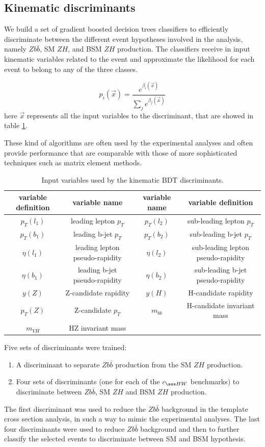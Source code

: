 \subsection{Kinematic discriminants}

We build a set of gradient boosted decision trees classifiers to efficiently discriminate
between the different event hypotheses involved in the analysis, namely $Z b\bar{b}$,
SM $Z H$, and BSM $Z H$ production. 
The classifiers receive in input kinematic variables related to the event and approximate
the likelihood for each event to belong to any of the three classes.

\begin{equation}
p_{i}(\vec x) = \frac{ e^{\beta_{i}(\vec x) } }{ \sum_j e^{\beta_{j}(\vec x) } }
\end{equation}
here $\vec x$ represents all the input variables to the discriminant, that are showed in table
\ref{tab:bdt_features}.

These kind of algorithms are often used by the experimental analyses and often provide
performance that are comparable with those of more sophisticated techniques such as matrix
element methods. 

\begin{table}
\centering
\begin{tabular}{||c|c||c|c||}
variable definition & variable name &  variable name & variable definition \\
\hline
$p_T(l_1)$ & leading lepton $p_T$ & $p_T(l_2)$ & sub-leading lepton $p_T$\\
$p_T(b_1)$ & leading b-jet $p_T$ & $p_T(b_2)$ & sub-leading b-jet $p_T$\\
$\eta(l_1)$ & leading lepton pseudo-rapidity & $\eta(l_2)$ & sub-leading lepton pseudo-rapidity\\
$\eta(b_1)$ & leading b-jet pseudo-rapidity  & $\eta(b_2)$ & sub-leading b-jet  pseudo-rapidity\\
$y(Z)$ & Z-candidate rapidity  & $y(H)$ & H-candidate rapidity \\
$p_T(Z)$ & Z-candidate $p_T$  & $m_{bb}$ & H-candidate invariant mass \\
$m_{VH}$ & HZ invariant mass  &  &  \\
\end{tabular}
\caption{
\label{tab:bdt_features}
Input variables used by the kinematic BDT discriminants.
}
\end{table}

Five sets of discriminants were trained:
\begin{enumerate}
\item A discriminant to separate $Z b\bar{b}$ production from the SM $Z H$ production.
\item Four sets of discriminants (one for each of the $c_{\sss HW}$ benchmarks) to
    discriminate between $Z b\bar{b}$, SM $Z H$ and BSM $Z H$ production.
\end{enumerate}
The first discriminant was used to reduce the $Z b\bar{b}$ background in the template
cross section analysis, in such a way to mimic the experimental analyses.
The last four discriminants were used to reduce $Z b\bar{b}$ background and then to further
classify the selected events to discriminate between SM and BSM hypothesis.

